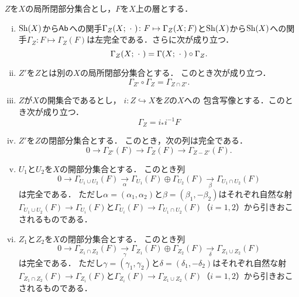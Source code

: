 \begin{leftbar}\begin{PRP}\label{PRP239}
    \(Z\)を\(X\)の局所閉部分集合とし，\(F\)を\(X\)上の層とする．
    \begin{enumerate}[(i)]
        \item \(\mathrm{Sh}(X)\)から\(\mathop{\textsf{Ab}}\nolimits\)への関手\(
            \Gamma_Z(X;\mathord{\ \cdot\ })\colon F\mapsto \Gamma_Z(X;F)
        \)と\(\mathrm{Sh}(X)\)から\(\mathrm{Sh}(X)\)への関手\(
            \Gamma_Z\colon F\mapsto \Gamma_Z(F)
        \)は左完全である．さらに次が成り立つ．\[
            \Gamma_Z(X;\mathord{\ \cdot\ })=\Gamma(X;\mathord{\ \cdot\ })\circ\Gamma_Z.
        \]
        \item \(Z'\)を\(Z\)とは別の\(X\)の局所閉部分集合とする．
        このとき次が成り立つ．\[
            \Gamma_{Z'}\circ \Gamma_{Z}
            =\Gamma_{Z\cap Z'}.
        \]
        \item \(Z\)が\(X\)の開集合であるとし，
        \(i\colon Z\hookrightarrow X\)を\(Z\)の\(X\)への
        包含写像とする．このとき次が成り立つ．\[
            \Gamma_Z=i_{\ast}i^{-1}F
        \]
        \item \(Z'\)を\(Z\)の閉部分集合とする．
        このとき，次の列は完全である．\[
            0\to \Gamma_{Z'}(F)\to \Gamma_{Z}(F)\to \Gamma_{Z-Z'}(F).
        \]
        \item \(U_1\)と\(U_2\)を\(X\)の開部分集合とする．
        このとき列\[
            0\to \Gamma_{U_1\cup U_2}(F)\underset{\alpha}{\to}
            \Gamma_{U_1}(F)\oplus \Gamma_{U_2}(F)\underset{\beta}{\to}
            \Gamma_{U_1\cap U_2}(F)
        \]は完全である．
        ただし\(\alpha=\left(\alpha_1,\alpha_2\right)\)と\(
            \beta=\left(\beta_1,-\beta_2\right)
        \)はそれぞれ自然な射\(
            \Gamma_{U_1\cup U_2}(F)\to \Gamma_{U_i}(F)
        \)と\(
            \Gamma_{U_i}(F)\to \Gamma_{U_1\cap U_2}(F)
        \)（\(i=1,2\)）から引きおこされるものである．
        \item \(Z_1\)と\(Z_2\)を\(X\)の閉部分集合とする．
        このとき列\[
            0\to \Gamma_{Z_1\cap Z_2}(F)\underset{\gamma}{\to}
            \Gamma_{Z_1}(F)\oplus \Gamma_{Z_2}(F)\underset{\delta}{\to}
            \Gamma_{Z_1\cup Z_2}(F)
        \]は完全である．
        ただし\(\gamma=\left(\gamma_1,\gamma_2\right)\)と\(
            \delta=\left(\delta_1,-\delta_2\right)
        \)はそれぞれ自然な射\(
            \Gamma_{Z_1\cap Z_2}(F)\to \Gamma_{Z_i}(F)
        \)と\(
            \Gamma_{Z_i}(F)\to \Gamma_{Z_1\cup Z_2}(F)
        \)（\(i=1,2\)）から引きおこされるものである．
    \end{enumerate}
\end{PRP}\end{leftbar}

